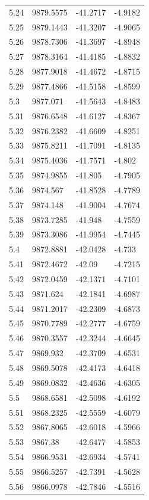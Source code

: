 \begin{table}[H]
\begin{tabular}{llll}
5.24 & 9879.5575 & -41.2717 & -4.9182 \\
5.25 & 9879.1443 & -41.3207 & -4.9065 \\
5.26 & 9878.7306 & -41.3697 & -4.8948 \\
5.27 & 9878.3164 & -41.4185 & -4.8832 \\
5.28 & 9877.9018 & -41.4672 & -4.8715 \\
5.29 & 9877.4866 & -41.5158 & -4.8599 \\
5.3 & 9877.071 & -41.5643 & -4.8483 \\
5.31 & 9876.6548 & -41.6127 & -4.8367 \\
5.32 & 9876.2382 & -41.6609 & -4.8251 \\
5.33 & 9875.8211 & -41.7091 & -4.8135 \\
5.34 & 9875.4036 & -41.7571 & -4.802 \\
5.35 & 9874.9855 & -41.805 & -4.7905 \\
5.36 & 9874.567 & -41.8528 & -4.7789 \\
5.37 & 9874.148 & -41.9004 & -4.7674 \\
5.38 & 9873.7285 & -41.948 & -4.7559 \\
5.39 & 9873.3086 & -41.9954 & -4.7445 \\
5.4 & 9872.8881 & -42.0428 & -4.733 \\
5.41 & 9872.4672 & -42.09 & -4.7215 \\
5.42 & 9872.0459 & -42.1371 & -4.7101 \\
5.43 & 9871.624 & -42.1841 & -4.6987 \\
5.44 & 9871.2017 & -42.2309 & -4.6873 \\
5.45 & 9870.7789 & -42.2777 & -4.6759 \\
5.46 & 9870.3557 & -42.3244 & -4.6645 \\
5.47 & 9869.932 & -42.3709 & -4.6531 \\
5.48 & 9869.5078 & -42.4173 & -4.6418 \\
5.49 & 9869.0832 & -42.4636 & -4.6305 \\
5.5 & 9868.6581 & -42.5098 & -4.6192 \\
5.51 & 9868.2325 & -42.5559 & -4.6079 \\
5.52 & 9867.8065 & -42.6018 & -4.5966 \\
5.53 & 9867.38 & -42.6477 & -4.5853 \\
5.54 & 9866.9531 & -42.6934 & -4.5741 \\
5.55 & 9866.5257 & -42.7391 & -4.5628 \\
5.56 & 9866.0978 & -42.7846 & -4.5516 \\

\end{tabular}
\end{table}

